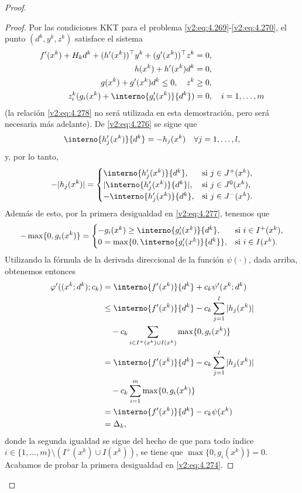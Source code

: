 \begin{proof}
\begin{proof}
Por las condiciones KKT para el problema \eqref{v2:eq:4.269}-\eqref{v2:eq:4.270}, el punto $(d^k, y^k, z^k)$ satisface el sistema
\begin{align}
f'(x^k) + H_k d^k + (h'(x^k))^\top y^k + (g'(x^k))^\top z^k &= 0, \label{v2:eq:4.275} \\
h(x^k) + h'(x^k)d^k &= 0, \label{v2:eq:4.276} \\
g(x^k) + g'(x^k)d^k \le 0, \quad z^k &\ge 0, \label{v2:eq:4.277} \\
z^k_i(g_i(x^k) + \interno{g'_i(x^k)}{d^k}) &= 0, \quad i = 1, \dots, m \label{v2:eq:4.278}
\end{align}
(la relación \eqref{v2:eq:4.278} no será utilizada en esta demostración, pero será necesaria más adelante). De \eqref{v2:eq:4.276} se sigue que
\[
\interno{h'_j(x^k)}{d^k} = -h_j(x^k) \quad \forall j = 1, \dots, l,
\]
y, por lo tanto,
\[
-|h_j(x^k)| = \begin{cases}
\interno{h'_j(x^k)}{d^k}, & \text{si } j \in J^+(x^k), \\
|\interno{h'_j(x^k)}{d^k}|, & \text{si } j \in J^0(x^k), \\
-\interno{h'_j(x^k)}{d^k}, & \text{si } j \in J^-(x^k).
\end{cases}
\]
Además de esto, por la primera desigualdad en \eqref{v2:eq:4.277}, tenemos que
\[
-\max\{0, g_i(x^k)\} = \begin{cases}
-g_i(x^k) \ge \interno{g'_i(x^k)}{d^k}, & \text{si } i \in I^+(x^k), \\
0 = \max\{0, \interno{g'_i(x^k)}{d^k}\}, & \text{si } i \in I(x^k).
\end{cases}
\]
Utilizando la fórmula de la derivada direccional de la función $\psi(\cdot)$, dada arriba, obtenemos entonces
\begin{align*}
\varphi'((x^k; d^k); c_k) &= \interno{f'(x^k)}{d^k} + c_k \psi'(x^k; d^k) \\
&\le \interno{f'(x^k)}{d^k} - c_k \sum_{j=1}^l |h_j(x^k)| \\
&\quad - c_k \sum_{i \in I^+(x^k) \cup I(x^k)} \max\{0, g_i(x^k)\} \\
&= \interno{f'(x^k)}{d^k} - c_k \sum_{j=1}^l |h_j(x^k)| \\
&\quad - c_k \sum_{i=1}^m \max\{0, g_i(x^k)\} \\
&= \interno{f'(x^k)}{d^k} - c_k \psi(x^k) \\
&= \Delta_k,
\end{align*}
donde la segunda igualdad se sigue del hecho de que para todo índice $i \in \{1, \dots, m\} \setminus (I^+(x^k) \cup I(x^k))$, se tiene que $\max\{0, g_i(x^k)\} = 0$. Acabamos de probar la primera desigualdad en \eqref{v2:eq:4.274}.


\end{proof}
\end{proof}
